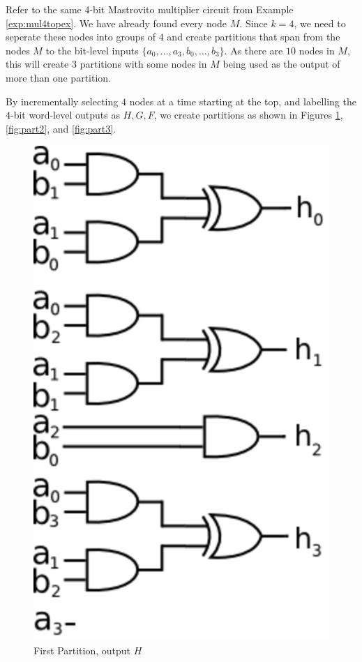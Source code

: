 \begin{Example}
Refer to the same 4-bit Mastrovito multiplier circuit from Example 
\ref{exp:mul4topex}. We have already found every node $M$. Since $k=4$,
we need to seperate these nodes into groups of $4$ and create partitions
that span from the nodes $M$ to the bit-level inputs 
$\{a_0,\dots,a_3,b_0,\dots,b_3\}$. As there are $10$ nodes in $M$, this will
create $3$ partitions with some nodes in $M$ being
used as the output of more than one partition.

By incrementally selecting $4$ nodes at a time starting at the top, and
labelling the $4$-bit word-level outputs as $H,G,F$, we create partitions
as shown in Figures \ref{fig:part1}, \ref{fig:part2}, and \ref{fig:part3}.

\begin{figure}[H]
	\begin{center}
	\includegraphics[scale=0.8]{figures/part1.eps}
	\end{center}
	\caption{First Partition, output $H$}
	\label{fig:part1}
\end{figure}


\end{Example}
